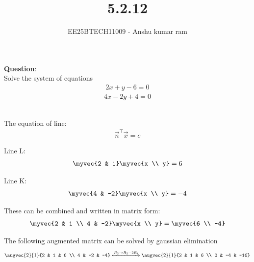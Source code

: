 \documentclass[journal]{IEEEtran}
\begin{document}

\vspace{3cm}

\title{5.2.12}
\author{EE25BTECH11009 - Anshu kumar ram}
\maketitle
{\let\newpage\relax\maketitle}

\renewcommand{\thefigure}{\theenumi}
\renewcommand{\thetable}{\theenumi}
\setlength{\intextsep}{10pt}

\renewcommand{\thetable}{\theenumi}

\textbf{Question}:\\
Solve the system of equations
\begin{align}
2x+y-6=0
\end{align}
\begin{align}
4x-2y+4=0
\end{align}

\solution \\

The equation of line:
\begin{align}
	\vec{n}^\top\vec{x}=c
\end{align}

Line L:
\begin{align}
\myvec{2 & 1}\myvec{x \\ y}=6
\end{align}

Line K:
\begin{align}
\myvec{4 & -2}\myvec{x \\ y}=-4
\end{align}

These can be combined and written in matrix form:
\begin{align}
\myvec{2 & 1 \\ 4 & -2}\myvec{x \\ y} = \myvec{6 \\ -4}
\end{align}

The following augmented matrix can be solved by gaussian elimination
\begin{align}
\augvec{2}{1}{2 & 1 & 6 \\ 4 & -2 & -4} \xleftrightarrow{R_2 \rightarrow R_2-2R_1} \augvec{2}{1}{2 & 1 & 6 \\ 0 & -4 & -16}
\end{align}
\end{document}
